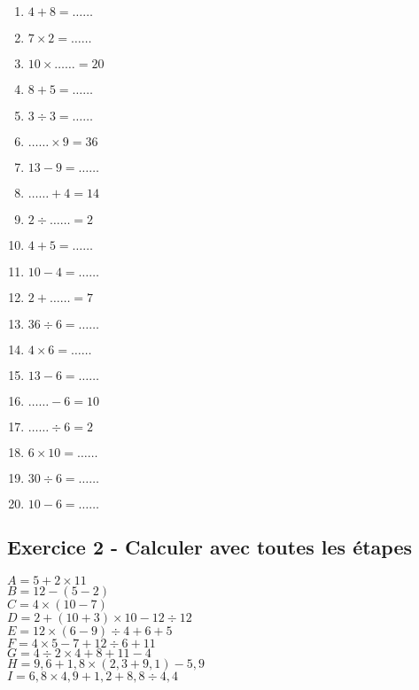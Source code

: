 \documentclass[11pt]{article}
\begin{document}
\begin{multicols}{4}\noindent
  \begin{enumerate}
    \item $4 + 8 = \ldots\ldots$
    \item $7 \times 2 = \ldots\ldots$
    \item $10 \times \ldots\ldots = 20$
    \item $8 + 5 = \ldots\ldots$
    \item $3 \div 3 = \ldots\ldots$
    \item $\ldots\ldots \times 9 = 36$
    \item $13 - 9 = \ldots\ldots$
    \item $\ldots\ldots + 4 = 14$
    \item $2 \div \ldots\ldots = 2$
    \item $4 + 5 = \ldots\ldots$
    \item $10 - 4 = \ldots\ldots$
    \item $2 + \ldots\ldots = 7$
    \item $36 \div 6 = \ldots\ldots$
    \item $4 \times 6 = \ldots\ldots$
    \item $13 - 6 = \ldots\ldots$
    \item $\ldots\ldots - 6 = 10$
    \item $\ldots\ldots \div 6 = 2$
    \item $6 \times 10 = \ldots\ldots$
    \item $30 \div 6 = \ldots\ldots$ 
    \item $10 - 6 = \ldots\ldots$
  \end{enumerate}
 \end{multicols}

\subsection*{Exercice 2 - Calculer avec toutes les étapes}

\begin{multicols}{3}
  \noindent
  $A = 5+2\times 11 $\\
  $B = 12-(5-2) $\\
  $C = 4 \times (10-7) $\\
  $D = 2+(10+3)\times 10-12\div 12 $\\
  $E = 12 \times (6-9) \div 4+6+5 $\\
  $F = 4\times 5-7+12\div 6+11 $\\
  $G = 4\div 2\times 4+8+11-4 $\\
  $H = 9{,}6+1{,}8\times (2{,}3+9{,}1)-5{,}9 $\\
  $I= 6{,}8\times 4{,}9+1{,}2+8{,}8\div 4{,}4$
\end{multicols}
\end{document}
